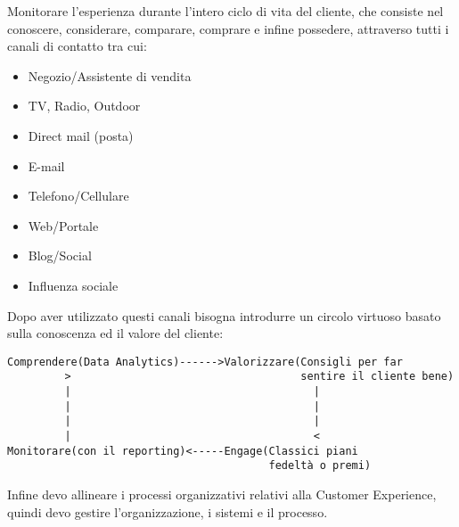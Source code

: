 \documentclass[11pt]{article}
\begin{document}
Monitorare l'esperienza durante l'intero ciclo di vita del cliente, che consiste nel conoscere, considerare, comparare, comprare e infine possedere,  attraverso tutti i canali di contatto tra cui:
\begin{itemize}[noitemsep,topsep=0ex]
	\item Negozio/Assistente di vendita
	\item TV, Radio, Outdoor
	\item Direct mail (posta)
	\item E-mail
	\item Telefono/Cellulare
	\item Web/Portale
	\item Blog/Social
	\item Influenza sociale
\end{itemize}
Dopo aver utilizzato questi canali bisogna introdurre un circolo virtuoso basato sulla conoscenza ed il valore del cliente:
\begin{verbatim}
Comprendere(Data Analytics)------>Valorizzare(Consigli per far 
         >                                    sentire il cliente bene)
         |                                      |
         |                                      |
         |                                      |
         |                                      <
Monitorare(con il reporting)<-----Engage(Classici piani 
                                         fedeltà o premi)
\end{verbatim}
Infine devo allineare i processi organizzativi relativi alla Customer Experience, quindi devo gestire l'organizzazione, i sistemi e il processo.
\end{document}
